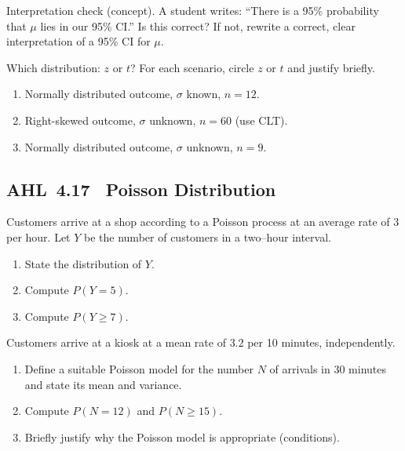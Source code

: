 \documentclass[11pt]{article}
\def\textbf#1{#1}%
\newcommand{\tocsubsection}[1]{\subsection{#1}}
\newcounter{question}
\begin{document}
\begin{question}
\textbf{Interpretation check (concept).}
A student writes: “There is a 95\% probability that $\mu$ lies in our 95\% CI.” 
Is this correct? If not, rewrite a correct, clear interpretation of a 95\% CI for $\mu$.
\end{question}

\begin{question}
\textbf{Which distribution: $z$ or $t$?}
For each scenario, circle $z$ or $t$ and justify briefly.
\begin{enumerate}
  \item Normally distributed outcome, $\sigma$ known, $n=12$.
  \item Right-skewed outcome, $\sigma$ unknown, $n=60$ (use CLT).
  \item Normally distributed outcome, $\sigma$ unknown, $n=9$.
\end{enumerate}
\end{question}



\tocsubsection{AHL 4.17 \; Poisson Distribution}

\begin{question}
Customers arrive at a shop according to a Poisson process at an average rate of $3$ per hour.
Let $Y$ be the number of customers in a two–hour interval.
\begin{enumerate}[label=(\roman*)]
\item State the distribution of $Y$.
\item Compute $P(Y=5)$.
\item Compute $P(Y\ge 7)$.
\end{enumerate}
\end{question}

\begin{question}
Customers arrive at a kiosk at a mean rate of $3.2$ per 10 minutes, independently.
\begin{enumerate}
  \item Define a suitable Poisson model for the number $N$ of arrivals in 30 minutes and state its mean and variance.
  \item Compute $P(N=12)$ and $P(N\ge 15)$.
  \item Briefly justify why the Poisson model is appropriate (conditions).
\end{enumerate}
\end{question}
\end{document}
